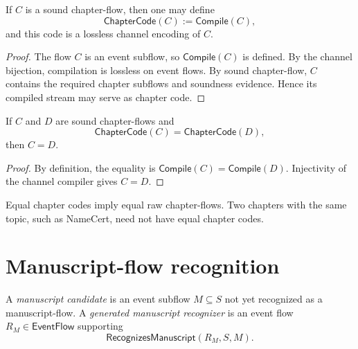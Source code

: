 \begin{theorem}
\label{thm:chapter-manuscript-sound-chapter-code}
If $C$ is a sound chapter-flow, then one may define
$$
  \mathsf{ChapterCode}(C):=\mathsf{Compile}(C),
$$
and this code is a lossless channel encoding of $C$.
\end{theorem}

\begin{proof}
The flow $C$ is an event subflow, so $\mathsf{Compile}(C)$ is defined. By the channel bijection, compilation is lossless on event flows. By sound chapter-flow, $C$ contains the required chapter subflows and soundness evidence. Hence its compiled stream may serve as chapter code.
\end{proof}

\begin{theorem}
\label{thm:chapter-manuscript-chapter-code-injective}
If $C$ and $D$ are sound chapter-flows and
$$
  \mathsf{ChapterCode}(C)=\mathsf{ChapterCode}(D),
$$
then $C=D$.
\end{theorem}

\begin{proof}
By definition, the equality is $\mathsf{Compile}(C)=\mathsf{Compile}(D)$. Injectivity of the channel compiler gives $C=D$.
\end{proof}

\begin{corollary}
\label{cor:chapter-manuscript-chapter-code-not-topic}
Equal chapter codes imply equal raw chapter-flows. Two chapters with the same topic, such as NameCert, need not have equal chapter codes.
\end{corollary}

\section{Manuscript-flow recognition}
\label{sec:chapter-manuscript-manuscript-flow}

\begin{definition}
\label{def:chapter-manuscript-manuscript-candidate-recognizer}
A \emph{manuscript candidate} is an event subflow $M\subseteq S$ not yet recognized as a manuscript-flow. A \emph{generated manuscript recognizer} is an event flow $R_M\in\mathsf{EventFlow}$ supporting
$$
  \mathsf{RecognizesManuscript}(R_M,S,M).
$$
\end{definition}

